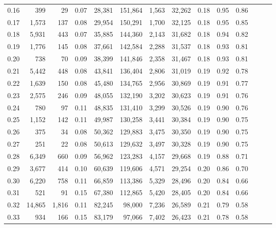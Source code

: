 \begin{tabular}{rrrrrrrrrrrrrr}
0.16 &     399 &     29 &  0.07 &   28,381 &  151,864 &   1,563 &  32,262 &  0.18 &  0.95 &      0.86 \\
0.17 &   1,573 &    137 &  0.08 &   29,954 &  150,291 &   1,700 &  32,125 &  0.18 &  0.95 &      0.85 \\
0.18 &   5,931 &    443 &  0.07 &   35,885 &  144,360 &   2,143 &  31,682 &  0.18 &  0.94 &      0.82 \\
0.19 &   1,776 &    145 &  0.08 &   37,661 &  142,584 &   2,288 &  31,537 &  0.18 &  0.93 &      0.81 \\
0.20 &     738 &     70 &  0.09 &   38,399 &  141,846 &   2,358 &  31,467 &  0.18 &  0.93 &      0.81 \\
0.21 &   5,442 &    448 &  0.08 &   43,841 &  136,404 &   2,806 &  31,019 &  0.19 &  0.92 &      0.78 \\
0.22 &   1,639 &    150 &  0.08 &   45,480 &  134,765 &   2,956 &  30,869 &  0.19 &  0.91 &      0.77 \\
0.23 &   2,575 &    246 &  0.09 &   48,055 &  132,190 &   3,202 &  30,623 &  0.19 &  0.91 &      0.76 \\
0.24 &     780 &     97 &  0.11 &   48,835 &  131,410 &   3,299 &  30,526 &  0.19 &  0.90 &      0.76 \\
0.25 &   1,152 &    142 &  0.11 &   49,987 &  130,258 &   3,441 &  30,384 &  0.19 &  0.90 &      0.75 \\
0.26 &     375 &     34 &  0.08 &   50,362 &  129,883 &   3,475 &  30,350 &  0.19 &  0.90 &      0.75 \\
0.27 &     251 &     22 &  0.08 &   50,613 &  129,632 &   3,497 &  30,328 &  0.19 &  0.90 &      0.75 \\
0.28 &   6,349 &    660 &  0.09 &   56,962 &  123,283 &   4,157 &  29,668 &  0.19 &  0.88 &      0.71 \\
0.29 &   3,677 &    414 &  0.10 &   60,639 &  119,606 &   4,571 &  29,254 &  0.20 &  0.86 &      0.70 \\
0.30 &   6,220 &    758 &  0.11 &   66,859 &  113,386 &   5,329 &  28,496 &  0.20 &  0.84 &      0.66 \\
0.31 &     521 &     91 &  0.15 &   67,380 &  112,865 &   5,420 &  28,405 &  0.20 &  0.84 &      0.66 \\
0.32 &  14,865 &  1,816 &  0.11 &   82,245 &   98,000 &   7,236 &  26,589 &  0.21 &  0.79 &      0.58 \\
0.33 &     934 &    166 &  0.15 &   83,179 &   97,066 &   7,402 &  26,423 &  0.21 &  0.78 &      0.58 \\

\end{tabular}
